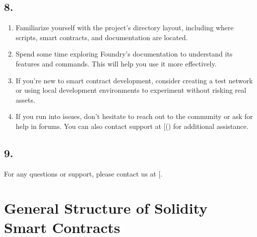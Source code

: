 \documentclass[letterpaper,10pt,english]{sphinxmanual}
\begin{document}
\section{8. }
\label{\detokenize{quickstart:additional-tips-for-beginners}}\begin{enumerate}
%
\item {} 
\sphinxAtStartPar
{}

\sphinxAtStartPar
Familiarize yourself with the project’s directory layout, including where scripts, smart contracts, and documentation are located.

\item {} 
\sphinxAtStartPar
{}

\sphinxAtStartPar
Spend some time exploring Foundry’s documentation to understand its features and commands. This will help you use it more effectively.

\item {} 
\sphinxAtStartPar
{}

\sphinxAtStartPar
If you’re new to smart contract development, consider creating a test network or using local development environments to experiment without risking real assets.

\item {} 
\sphinxAtStartPar
{}

\sphinxAtStartPar
If you run into issues, don’t hesitate to reach out to the community or ask for help in forums. You can also contact support at {[}\sphinxhref{mailto:your-email@example.com}{your\sphinxhyphen{}email@example.com}{]}() for additional assistance.

\end{enumerate}


\section{9. }
\label{\detokenize{quickstart:contact-and-support}}
\sphinxAtStartPar
For any questions or support, please contact us at {[}\sphinxhref{mailto:starlose13@gmail.com}{starlose13@gmail.com}{]}.

\sphinxstepscope


\chapter{General Structure of Solidity Smart Contracts}
\label{\detokenize{contracts_structure:general-structure-of-solidity-smart-contracts}}\label{\detokenize{contracts_structure::doc}}
\end{document}
